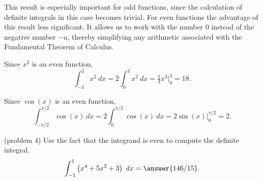 \documentclass[handout]{ximera}
\begin{document}
\begin{image}
\end{image}


This result is especially important for odd functions, since the calculation of definite integrals in this case
becomes trivial. For even functions the advantage of this result less significant.  It allows us to work with the number
$0$ instead of the negative number $-a$, thereby simplifying any arithmetic associated with the 
Fundamental Theorem of Calculus.

\begin{example}[example 3]
Since $x^2$ is an even function, 
\[\int_{-3}^3 x^2 \ dx = 2\int_0^3 x^2 \ dx = \tfrac{2}{3}x^3\Bigg|_0^3 = 18.\]
\end{example}

\begin{example}[example 4]
Since $\cos(x)$ is an even function, 
\[\int_{-\pi/2}^{\pi/2} \cos(x) \ dx = 2\int_0^{\pi/2} \cos(x) \ dx = 2\sin(x)\Bigg|_0^{\pi/2} = 2.\]
\end{example}

\begin{problem}(problem 4)
Use the fact that the integrand is even to compute the definite integral.
\[\int_{-1}^1 \left(x^4 + 5x^2 + 3 \right) \ dx =\answer {146/15}.\]
\end{problem}
\end{document}
